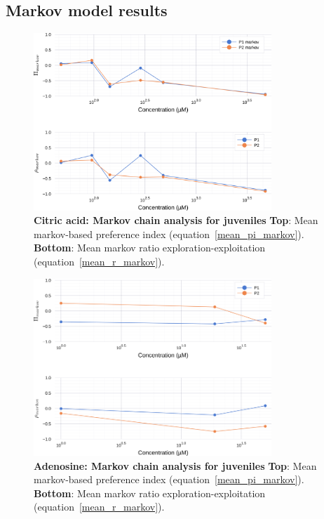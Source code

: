 \begin{appendices}
  \chapter{Markov model results}
    \begin{figure}[h]
      \centering
      \includegraphics[width=0.8\textwidth]{part_2/assets/citricacid_markov.png}
      \caption{\textbf{Citric acid: Markov chain analysis for juveniles} \textbf{Top}: Mean markov-based preference index (equation~\ref{mean_pi_markov}). \textbf{Bottom}: Mean markov ratio exploration-exploitation (equation~\ref{mean_r_markov}).}
      \label{citric_acid_markov}
    \end{figure}
    \begin{figure}[h]
      \centering
      \includegraphics[width=0.8\textwidth]{part_2/assets/adenosine_markov.png}
      \caption{\textbf{Adenosine: Markov chain analysis for juveniles} \textbf{Top}: Mean markov-based preference index (equation~\ref{mean_pi_markov}). \textbf{Bottom}: Mean markov ratio exploration-exploitation (equation~\ref{mean_r_markov}).}

\end{figure}
\end{appendices}
